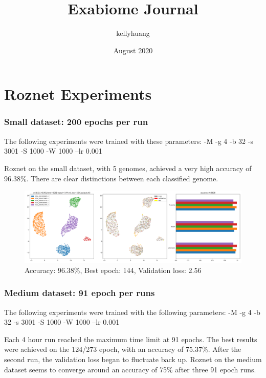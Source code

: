 \documentclass{article}
\title{Exabiome Journal}
\author{kellyhuang }
\date{August 2020}
\begin{document}
\maketitle

\section{Roznet Experiments }

\subsubsection*{Small dataset: 200 epochs per run} 

The following experiments were trained with these parameters: 
\newline
-M -g 4 -b 32 -s 3001 -S 1000 -W 1000 --lr 0.001

Roznet on the small dataset, with 5 genomes, achieved a very high accuracy of 96.38\%. There are clear distinctions between each classified genome.  

\begin{figure}[h]
  \includegraphics[width=\linewidth]{new_journal/figures/experiments/roznet/small/e200.png}
  \caption{Accuracy: 96.38\%, Best epoch: 144, Validation loss: 2.56}
\end{figure}

\clearpage

\subsubsection*{Medium dataset: 91 epoch per runs}
The following experiments were trained with the following parameters: 
\newline
-M -g 4 -b 32 -s 3001 -S 1000 -W 1000 --lr 0.001

Each 4 hour run reached the maximum time limit at 91 epochs. The best results were achieved on the 124/273 epoch, with an accuracy of 75.37\%. After the second run, the validation loss began to fluctuate back up. Roznet on the medium dataset seems to converge around an accuracy of 75\% after three 91 epoch runs. 
\end{document}
